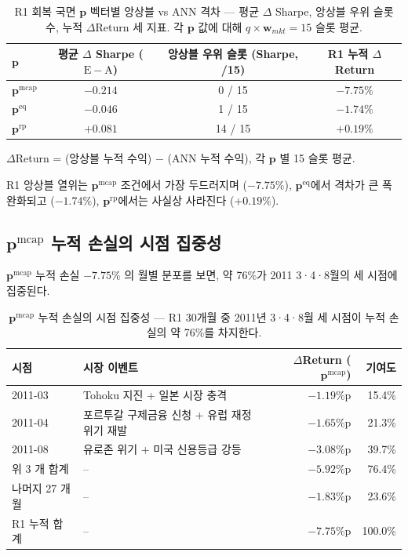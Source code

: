\documentclass[eng]{kjas3}
\begin{document}
\begin{table}[t]
\centering
\caption{R1 회복 국면 $\mathbf{p}$ 벡터별 앙상블 vs ANN 격차 — 평균 $\Delta$ Sharpe,
앙상블 우위 슬롯 수, 누적 $\Delta$Return 세 지표.
각 $\mathbf{p}$ 값에 대해 $q \times \mathbf{w}_{mkt} = 15$ 슬롯 평균.}
\label{tab:r1_pmatrix_delta}
\setlength{\tabcolsep}{8pt}
\renewcommand{\arraystretch}{1.2}
\small
\begin{tabular}{lccc}
\toprule
$\mathbf{p}$ & 평균 $\Delta$ Sharpe ($\mathrm{E} - \mathrm{A}$) & 앙상블 우위 슬롯 (Sharpe, /15) & R1 누적 $\Delta$Return \\
\midrule
$\mathbf{p}^{\mathrm{mcap}}$ & $-0.214$ & 0 / 15  & $-7.75\%$ \\
$\mathbf{p}^{\mathrm{eq}}$   & $-0.046$ & 1 / 15  & $-1.74\%$ \\
$\mathbf{p}^{\mathrm{rp}}$   & $+0.081$ & 14 / 15 & $+0.19\%$ \\
\bottomrule
\end{tabular}
\par\smallskip
\footnotesize
\raggedright
$\Delta$Return = (앙상블 누적 수익) $-$ (ANN 누적 수익), 각 $\mathbf{p}$ 별 15 슬롯 평균.
\end{table}

R1 앙상블 열위는 $\mathbf{p}^{\mathrm{mcap}}$ 조건에서 가장 두드러지며 ($-7.75\%$), $\mathbf{p}^{\mathrm{eq}}$에서 격차가 큰 폭 완화되고 ($-1.74\%$), $\mathbf{p}^{\mathrm{rp}}$에서는 사실상 사라진다 ($+0.19\%$).

\subsection{$\mathbf{p}^{\mathrm{mcap}}$ 누적 손실의 시점 집중성}

$\mathbf{p}^{\mathrm{mcap}}$ 누적 손실 $-7.75\%$ 의 월별 분포를 보면, 약 76\%가 2011  3·4·8월의 세 시점에 집중된다.

\begin{table}[t]
\centering
\caption{$\mathbf{p}^{\mathrm{mcap}}$ 누적 손실의 시점 집중성 — R1 30개월 중
2011년 3·4·8월 세 시점이 누적 손실의 약 76\%를 차지한다.}
\label{tab:r1_loss_concentration}
\setlength{\tabcolsep}{8pt}
\renewcommand{\arraystretch}{1.2}
\small
\begin{tabular}{llrr}
\toprule
시점 & 시장 이벤트 & $\Delta$Return ($\mathbf{p}^{\mathrm{mcap}}$) & 기여도 \\
\midrule
2011-03 & Tohoku 지진 + 일본 시장 충격              & $-1.19$\%p & 15.4\% \\
2011-04 & 포르투갈 구제금융 신청 + 유럽 재정위기 재발 & $-1.65$\%p & 21.3\% \\
2011-08 & 유로존 위기 + 미국 신용등급 강등           & $-3.08$\%p & 39.7\% \\
\midrule
위 3 개 합계 & --                                  & $-5.92$\%p & 76.4\% \\
나머지 27 개월 & --                                & $-1.83$\%p & 23.6\% \\
\midrule
R1 누적 합계 & --                                  & $-7.75$\%p & 100.0\% \\
\bottomrule
\end{tabular}
\end{table}
\end{document}
